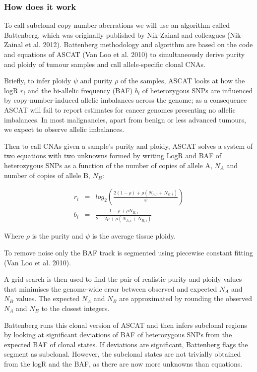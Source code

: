 \documentclass[]{article}
\begin{document}
\hypertarget{how-does-it-work}{%
\subsubsection{How does it work}\label{how-does-it-work}}

To call subclonal copy number aberrations we will use an algorithm
called Battenberg, which was originally published by Nik-Zainal and
colleagues (Nik-Zainal et al. 2012). Battenberg methodology and
algorithm are based on the code and equations of ASCAT (Van Loo et al.
2010) to simultaneously derive purity and ploidy of tumour samples and
call allele-specific clonal CNAs.

Briefly, to infer ploidy \(\psi\) and purity \(\rho\) of the samples,
ASCAT looks at how the logR \(r_i\) and the bi-allelic frequency (BAF)
\(b_i\) of heterozygous SNPs are influenced by copy-number-induced
allelic imbalances across the genome; as a consequence ASCAT will fail
to report estimates for cancer genomes presenting no allelic imbalances.
In most malignancies, apart from benign or less advanced tumours, we
expect to observe allelic imbalances.

Then to call CNAs given a sample's purity and ploidy, ASCAT solves a
system of two equations with two unknowns formed by writing LogR and BAF
of heterozygous SNPs as a function of the number of copies of allele A,
\(N_A\) and number of copies of allele B, \(N_B\):

\[\begin{array}{lcl} r_i&=&
  log_2(\frac{2(1-\rho)+\rho(N_{A,i}+N_{B,i})}{\psi})\\ b_i&=&\frac{1-\rho+\rho N_{B,i}}{2-2\rho+\rho(N_{A,i}+N_{B,i})}
\end{array}\]

Where \(\rho\) is the purity and \(\psi\) is the average tissue ploidy.

To remove noise only the BAF track is segmented using piecewise constant
fitting (Van Loo et al. 2010).

A grid search is then used to find the pair of realistic purity and
ploidy values that minimises the genome-wide error between observed and
expected \(N_A\) and \(N_B\) values. The expected \(N_A\) and \(N_B\)
are approximated by rounding the observed \(N_A\) and \(N_B\) to the
closest integers.

Battenberg runs this clonal version of ASCAT and then infers subclonal
regions by looking at significant deviations of BAF of heterozygous SNPs
from the expected BAF of clonal states. If deviations are significant,
Battenberg flags the segment as subclonal. However, the subclonal states
are not trivially obtained from the logR and the BAF, as there are now
more unknowns than equations.
\end{document}
